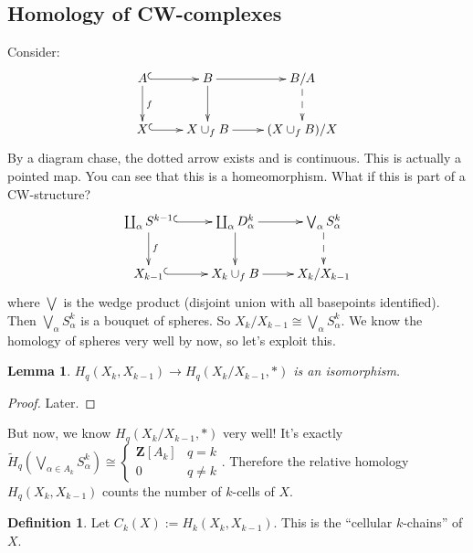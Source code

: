 \documentclass{amsart}
\theoremstyle{theorem}
\newtheorem{lemma}[theorem]{Lemma}
\theoremstyle{definition}
\newtheorem{definition}[theorem]{Definition}
\newcommand{\Z}{\mathbf Z}
\begin{document}
\subsection{Homology of CW-complexes}
Consider:
\begin{equation*}
\xymatrix{A\ar@{^(->}[r]\ar[d]^f & B\ar[r]\ar[d] & B/A\ar@{-->}[d]\\
X\ar@{^(->}[r] & X\cup_f B\ar[r] & (X\cup_fB)/X}
\end{equation*}
By a diagram chase, the dotted arrow exists and is continuous. This is actually a pointed map. You can see that this is a homeomorphism. What if this is part of a CW-structure?
\begin{equation*}
\xymatrix{\coprod_{\alpha}S^{k-1}\ar@{^(->}[r]\ar[d]^f & \coprod_{\alpha}D^k_\alpha\ar[r]\ar[d] & \bigvee_{\alpha}S^k_\alpha\ar@{-->}[d]\\
X_{k-1}\ar@{^(->}[r] & X_k\cup_f B\ar[r] & X_k/X_{k-1}}
\end{equation*}
where $\bigvee$ is the wedge product (disjoint union with all basepoints identified). Then $\bigvee_{\alpha}S^k_\alpha$ is a bouquet of spheres. So $X_k/X_{k-1}\cong\bigvee_{\alpha}S^k_\alpha$. We know the homology of spheres very well by now, so let's exploit this.
\begin{lemma}
$ H_q(X_k,X_{k-1})\to H_q(X_k/X_{k-1},\ast)$ is an isomorphism.
\end{lemma}
\begin{proof}
Later.
\end{proof}
But now, we know $ H_q(X_k/X_{k-1},\ast)$ very well! It's exactly $\widetilde{ H}_q(\bigvee_{\alpha\in A_k}S^k_\alpha)\cong\begin{cases}\Z[A_k] & q=k \\ 0 & q\neq k\end{cases}$. Therefore the relative homology $ H_q(X_k,X_{k-1})$ counts the number of $k$-cells of $X$.
\begin{definition}
Let $C_k(X):= H_k(X_k,X_{k-1})$. This is the ``cellular $k$-chains'' of $X$.
\end{definition}
\end{document}
